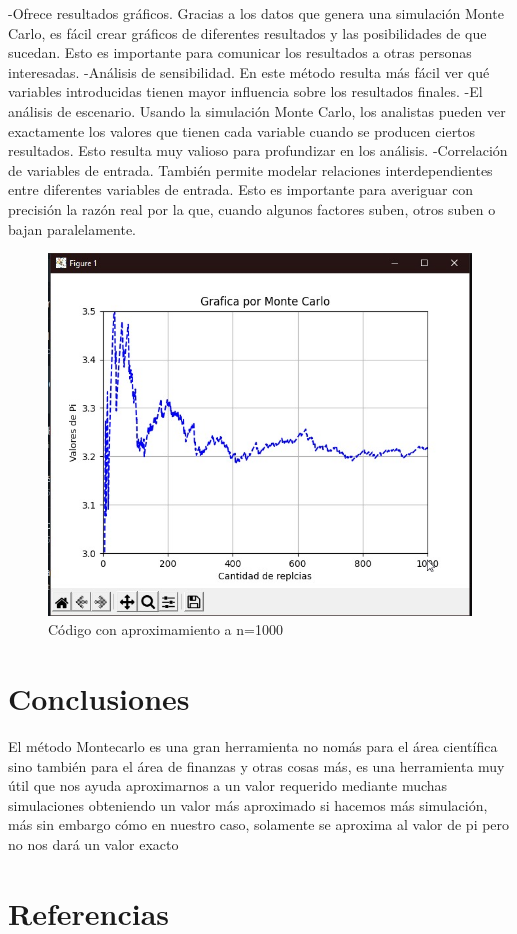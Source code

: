\documentclass{article}
\begin{document}
-Ofrece resultados gráficos. Gracias a los datos que genera una simulación Monte Carlo, es fácil crear gráficos de diferentes resultados y las posibilidades de que sucedan. Esto es importante para comunicar los resultados a otras personas interesadas.
-Análisis de sensibilidad. En este método resulta más fácil ver qué variables introducidas tienen mayor influencia sobre los resultados finales.
-El análisis de escenario. Usando la simulación Monte Carlo, los analistas pueden ver exactamente los valores que tienen cada variable cuando se producen ciertos resultados. Esto resulta muy valioso para profundizar en los análisis.
-Correlación de variables de entrada. También permite modelar relaciones interdependientes entre diferentes variables de entrada. Esto es importante para averiguar con precisión la razón real por la que, cuando algunos factores suben, otros suben o bajan paralelamente.
\begin{figure} [htp]%
    \centering
    \includegraphics[width=140mm]{grafica.jpeg} %
    \caption{Código con aproximamiento a n=1000}
    \label{grafica}
\end{figure}

\section{Conclusiones}
El método Montecarlo es una gran herramienta no nomás para el área científica sino también para el área de finanzas y otras cosas más, es una herramienta muy útil que nos ayuda aproximarnos a un valor requerido mediante muchas simulaciones obteniendo un valor más aproximado si hacemos más simulación, más sin embargo cómo en nuestro caso, solamente se aproxima al valor de pi pero no nos dará un valor exacto 

\section{Referencias}
\cite{Met}
\cite{Simul}


\end{document}
